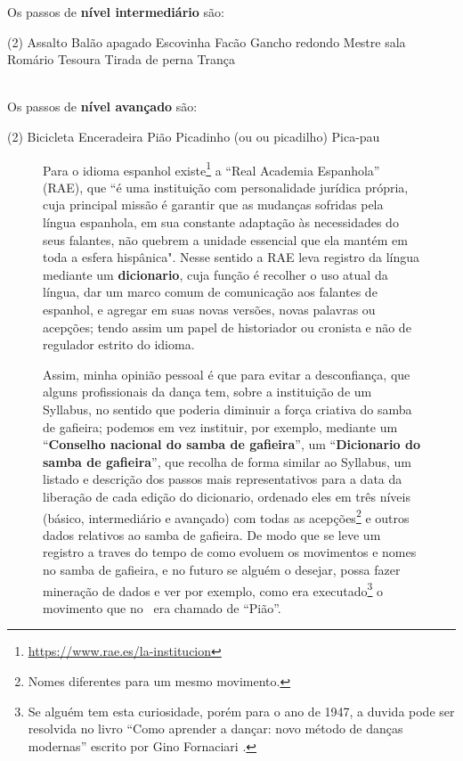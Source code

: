 Os passos de \textbf{nível intermediário} são:
\begin{tasks}(2)
\task Assalto
\task Balão apagado
\task Escovinha
\task Facão
\task Gancho redondo
\task Mestre sala
\task Romário
\task Tesoura
\task Tirada de perna
\task Trança
\end{tasks}~\\

Os passos de \textbf{nível avançado} são:
\begin{tasks}(2)
\task Bicicleta
\task Enceradeira
\task Pião
\task Picadinho (ou ou picadilho)
\task Pica-pau
\end{tasks}



\begin{figure}[t]
\begin{elaboracion}[title=Necessidade e alternativas ao Syllabus]

Para o idioma espanhol existe\footnote{\url{https://www.rae.es/la-institucion}} a ``Real Academia Espanhola'' (RAE),
que ``é uma instituição com personalidade jurídica própria, cuja principal missão é garantir 
que as mudanças sofridas pela língua espanhola, 
em sua constante adaptação às necessidades do seus falantes, 
não quebrem a unidade essencial que ela mantém em toda a esfera hispânica".
Nesse sentido a RAE leva registro da língua mediante um \textbf{dicionario},
cuja função é recolher o uso atual da língua, dar um marco comum de comunicação aos falantes de espanhol,
e agregar em suas novas versões, novas palavras ou acepções;
tendo assim um papel de historiador ou cronista e não de regulador estrito do idioma.

Assim, minha opinião pessoal é que para evitar a desconfiança, que alguns profissionais da dança tem,
sobre a instituição de um Syllabus, no sentido  que poderia diminuir a força criativa do samba de gafieira;
podemos em vez instituir, por exemplo, mediante um ``\textbf{Conselho nacional do samba de gafieira}'',
um ``\textbf{Dicionario do samba de gafieira}'', que recolha de forma similar ao Syllabus,
um listado e descrição dos passos mais representativos para a data da liberação de cada edição do dicionario, 
ordenado eles em três níveis (básico, intermediário e avançado) 
com todas as acepções\footnote{Nomes diferentes para um mesmo movimento.}
e outros dados relativos ao samba de gafieira.
De modo que se leve um registro a traves do tempo de como evoluem os movimentos e nomes no samba de gafieira,
e no futuro se alguém o desejar, possa fazer mineração de dados e ver 
por exemplo, como era executado\footnote{Se alguém tem esta curiosidade,
porém para o ano de 1947, a duvida pode ser resolvida no livro
``Como aprender a dançar: novo método de danças modernas'' escrito por Gino Fornaciari \cite[pp. 72]{fornaciari1947aprender}.} 
o movimento que no \AnoLivro~era chamado de ``Pião''.
\end{elaboracion}
\label{fig:ImportanciaSyllabus}
\end{figure}


